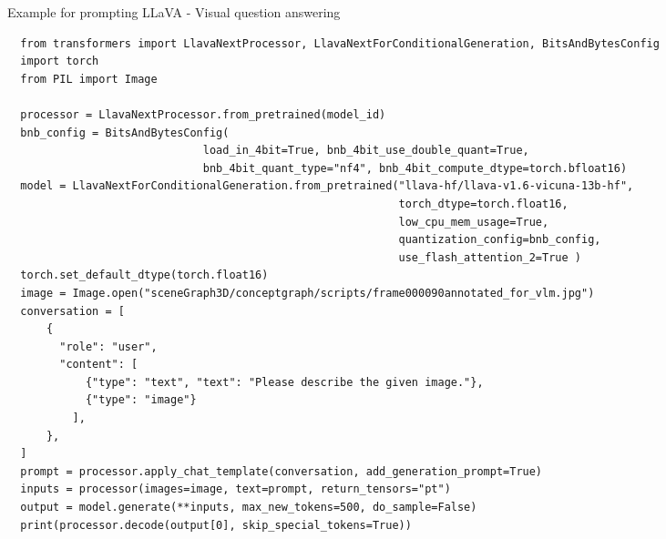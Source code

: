 \documentclass[
  a4paper,  %
  twoside,  %
  bibliography=totoc,
  headsepline,
  cleardoublepage=empty,
  parskip=half,
  draft=false
]{scrbook}
\begin{document}
\begin{listing}[ht]
  \caption{Example for prompting LLaVA - Visual question answering}
  \label{lst:lavaTheory}
\begin{lstlisting}
  from transformers import LlavaNextProcessor, LlavaNextForConditionalGeneration, BitsAndBytesConfig
  import torch
  from PIL import Image
  
  processor = LlavaNextProcessor.from_pretrained(model_id)
  bnb_config = BitsAndBytesConfig(
                              load_in_4bit=True, bnb_4bit_use_double_quant=True,
                              bnb_4bit_quant_type="nf4", bnb_4bit_compute_dtype=torch.bfloat16)
  model = LlavaNextForConditionalGeneration.from_pretrained("llava-hf/llava-v1.6-vicuna-13b-hf", 
                                                            torch_dtype=torch.float16, 
                                                            low_cpu_mem_usage=True, 
                                                            quantization_config=bnb_config,
                                                            use_flash_attention_2=True ) 
  torch.set_default_dtype(torch.float16)
  image = Image.open("sceneGraph3D/conceptgraph/scripts/frame000090annotated_for_vlm.jpg")
  conversation = [
      {
        "role": "user",
        "content": [
            {"type": "text", "text": "Please describe the given image."},
            {"type": "image"}
          ],
      },
  ]
  prompt = processor.apply_chat_template(conversation, add_generation_prompt=True)
  inputs = processor(images=image, text=prompt, return_tensors="pt")
  output = model.generate(**inputs, max_new_tokens=500, do_sample=False)
  print(processor.decode(output[0], skip_special_tokens=True))
  \end{lstlisting}
\end{listing}
\end{document}
